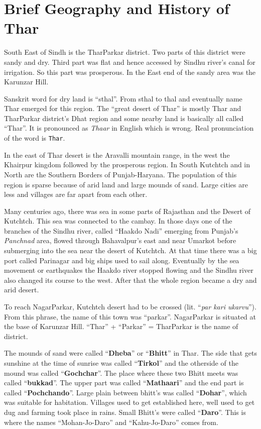 \chapter{Brief Geography and History of Thar}
South East of Sindh is the TharParkar district. Two parts of this district were
sandy and dry. Third part was flat and hence accessed by Sindhu river's canal
for irrigation. So this part was prosperous. In the East end of the sandy area
was the Karunzar Hill.

Sanskrit word for dry land is ``sthal''. From sthal to thal and eventually name
Thar emerged for this region. The ``great desert of Thar'' is mostly Thar and
TharParkar district's Dhat region and some nearby land is basically all called
``Thar''. It is pronounced as \textit{Thaar} in English which is wrong. Real
pronunciation of the word is \texttt{Thar}.

In the east of Thar desert is the Aravalli mountain range, in the west the
Khairpur kingdom followed by the prosperous region. In South Kutchtch and in
North are the Southern Borders of Punjab-Haryana. The population of this
region is sparse because of arid land and large mounds of sand. Large cities
are less and villages are far apart from each other.

Many centuries ago, there was sea in some parts of Rajasthan and the Desert of
Kutchtch. This sea was connected to the cambay. In those days one of the
branches of the Sindhu river, called ``Haakdo Nadi'' emerging from Punjab's
\textit{Panchnad} area, flowed through Bahavalpur's east and near Umarkot
before submerging into the sea near the desert of Kutchtch. At that time there
was a big port called Parinagar and big ships used to sail along. Eventually by
the sea movement or earthquakes the Haakdo river stopped flowing and the Sindhu
river also changed its course to the west. After that the whole region became a
dry and arid desert.

To reach NagarParkar, Kutchtch desert had to be crossed (lit. ``\textit{par
kari ukarvu}''). From this phrase, the name of this town was ``parkar''.
NagarParkar is situated at the base of Karunzar Hill. ``Thar'' + ``Parkar'' =
TharParkar is the name of district.

The mounds of sand were called ``\textbf{Dheba}'' or ``\textbf{Bhitt}'' in
Thar. The side that gets sunshine at the time of sunrise was called
``\textbf{Tirkol}'' and the otherside of the mound was called
``\textbf{Gochchar}''. The place where these two Bhitt meets was called
``\textbf{bukkad}''. The upper part was called ``\textbf{Mathaari}'' and the
end part is called  ``\textbf{Pochchando}''. Large plain between bhitt's was
called ``\textbf{Dohar}'', which was suitable for habitation. Villages used to
get established here, well used to get dug and farming took place in rains.
Small Bhitt's were called ``\textbf{Daro}''. This is where the names
``Mohan-Jo-Daro'' and ``Kahu-Jo-Daro'' comes from.

